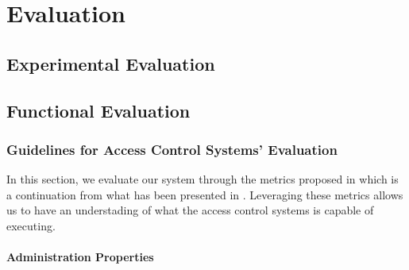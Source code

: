 \chapter{Evaluation}
\label{chap:evaluation}

\section{Experimental Evaluation}

\section{Functional Evaluation}

\subsection{Guidelines for Access Control Systems' Evaluation}

In this section, we evaluate our system through the metrics proposed in \cite{hu_guidelines_2012} which is a continuation from what has been presented in \cite{hu_assessment_2006}. Leveraging these metrics allows us to have an understading of what the access control systems is capable of executing.

\subsubsection{Administration Properties}

